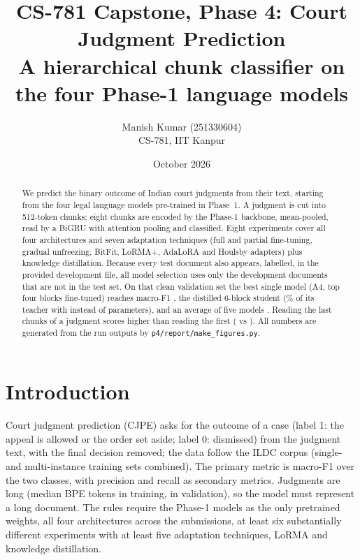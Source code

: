 \documentclass[11pt,a4paper]{article}
\title{\textbf{CS-781 Capstone, Phase 4: Court Judgment Prediction}\\[2pt]
\large A hierarchical chunk classifier on the four Phase-1 language models}
\author{Manish Kumar (251330604)\\ CS-781, IIT Kanpur}
\date{October 2026}
\newcommand{\code}[1]{\texttt{\small #1}}
\begin{document}
\maketitle

\begin{abstract}
\noindent We predict the binary outcome of Indian court judgments from their text, starting from the four
legal language models pre-trained in Phase~1.  A judgment is cut into 512-token chunks; eight chunks are
encoded by the Phase-1 backbone, mean-pooled, read by a BiGRU with attention pooling and classified.
Eight experiments cover all four architectures and seven adaptation techniques (full and partial
fine-tuning, gradual unfreezing, BitFit, LoRMA+, AdaLoRA and Houlsby adapters) plus knowledge distillation.
Because every test document also appears, labelled, in the provided development file, all model selection uses
only the \nval{} development documents that are not in the test set.  On that clean validation set the best
single model (A4, top four blocks fine-tuned) reaches macro-F1 \foneEsix, the distilled 6-block student
\foneEeight{} (\kdretain\% of its teacher with \kdparams{} instead of \teacherparams{} parameters), and an
average of five models \ensfive.  Reading the last chunks of a judgment scores higher than reading the first
(\foneEsix{} vs \foneablfirst).  All numbers are generated from the run outputs by
\code{p4/report/make\_figures.py}.
\end{abstract}

\tableofcontents
\newpage

\section{Introduction}
Court judgment prediction (CJPE) asks for the outcome of a case (label 1: the appeal is allowed or the order
set aside; label 0: dismissed) from the judgment text, with the final decision removed; the data follow the ILDC corpus \cite{malik2021ildc} (single- and
multi-instance training sets combined).  The primary metric is
macro-F1 over the two classes, with precision and recall as secondary metrics.  Judgments are long (median
\medtrain{} BPE tokens in training, \medval{} in validation), so the model must represent a long document.
The rules require the Phase-1 models as the only pretrained weights, all four architectures across the
submissions, at least six substantially different experiments with at least five adaptation techniques, LoRMA
and knowledge distillation.
\end{document}
